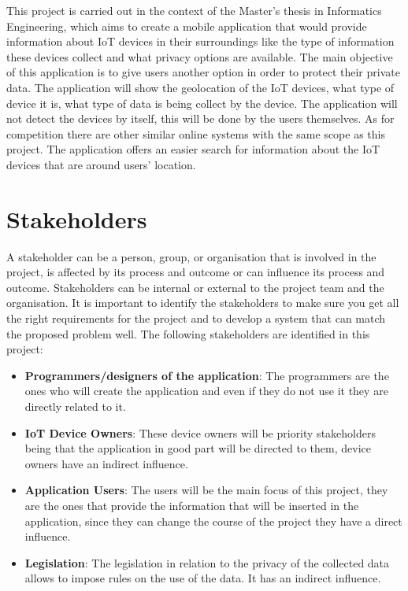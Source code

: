 \documentclass{scrreprt}
\begin{document}
This project is carried out in the context of the Master's thesis in Informatics
Engineering, which aims to create a mobile application that would provide
information about IoT devices in their surroundings like the type of information
these devices collect and what privacy options are available. The main objective
of this application is to give users another option in order to protect
their private data. The application will show the geolocation of the IoT
devices, what type of device it is, what type of data is being collect by
the device. The application will not detect the devices by itself, this will
be done by the users themselves. As for competition there are other similar
online systems with the same scope as this project. The application offers
an easier search for information about the IoT devices that are around users'
location.

\section{Stakeholders}

A stakeholder can be a person, group, or organisation that is involved in
the project, is affected by its process and outcome or can influence its
process and outcome. Stakeholders can be internal or external to the project
team and the organisation. \cite{fulton2017chapter}
\newline
It is important to identify the stakeholders to make sure you get all the
right requirements for the project and to develop a system that can match
the proposed problem well.
\newline
The following stakeholders are identified in this project:
\begin{itemize}
    \item \textbf{Programmers/designers of the application}: The programmers are the ones who will create the application and even if they do not use it they are directly related to it.
    \item \textbf{IoT Device Owners}: These device owners will be priority stakeholders being that the application in good part will be directed to them, device owners have an indirect influence.
    \item \textbf{Application Users}: The users will be the main focus of this project, they are the ones that provide the information that will be inserted in the application, since they can change the course of the project they have a direct influence.
    \item \textbf{Legislation}: The legislation in relation to the privacy of the collected data allows to impose rules on the use of the data. It has an indirect influence.
\end{itemize}
\end{document}
